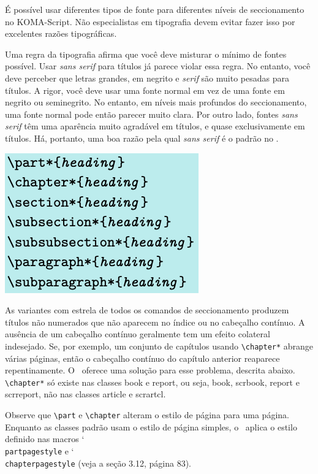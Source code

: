 É possível usar diferentes tipos de fonte para diferentes níveis de seccionamento no KOMA-Script. Não especialistas em tipografia devem evitar fazer isso por excelentes razões tipográficas.

Uma regra da tipografia afirma que você deve misturar o mínimo de fontes possível. Usar \textit{sans serif} para títulos já parece violar essa regra. No entanto, você deve perceber que letras grandes, em negrito e \textit{serif} são muito pesadas para títulos. A rigor, você deve usar uma fonte normal em vez de uma fonte em negrito ou seminegrito. No entanto, em níveis mais profundos do seccionamento, uma fonte normal pode então parecer muito clara. Por outro lado, fontes \textit{sans serif} têm uma aparência muito agradável em títulos, e quase exclusivamente em títulos. Há, portanto, uma boa razão pela qual \textit{sans serif} é o padrão no \KOMAScript.

\includegraphics[width=0.40\linewidth]{imagem20.png}

As variantes com estrela de todos os comandos de seccionamento produzem títulos não numerados que não aparecem no índice ou no cabeçalho contínuo. A ausência de um cabeçalho contínuo geralmente tem um efeito colateral indesejado. Se, por exemplo, um conjunto de capítulos usando \verb|\chapter*| abrange várias páginas, então o cabeçalho contínuo do capítulo anterior reaparece repentinamente. O \KOMAScript\ oferece uma solução para esse problema, descrita abaixo. \verb|\chapter*| só existe nas classes book e report, ou seja, book, scrbook, report e scrreport, não nas classes article e scrartcl.

Observe que \verb|\part| e \verb|\chapter| alteram o estilo de página para uma página. Enquanto as classes padrão usam o estilo de página simples, o \KOMAScript\ aplica o estilo definido nas macros \char`\\\texttt{part\-pa\-ge\-sty\-le} e \char`\\\texttt{chap\-ter\-pa\-ge\-sty\-le} (veja a seção 3.12, página 83).

